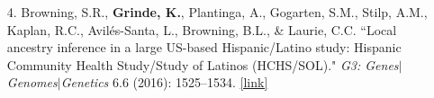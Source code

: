 \documentclass[margin]{res}
\begin{document}
\begin{resume}
\begin{itemize}
\item[4.] Browning, S.R., \textbf{Grinde, K.}, Plantinga, A., Gogarten, S.M., Stilp, A.M., Kaplan, R.C., Avil\'es-Santa, L., Browning, B.L., \& Laurie, C.C. ``Local ancestry inference in a large US-based Hispanic/Latino study: Hispanic Community Health Study/Study of Latinos (HCHS/SOL)." \textit{G3: Genes}$|$\textit{Genomes}$|$\textit{Genetics} 6.6 (2016): 1525--1534.
\href{https://academic.oup.com/g3journal/article/6/6/1525/6029932}{[link]}
	

\end{itemize}
\end{resume}
\end{document}
